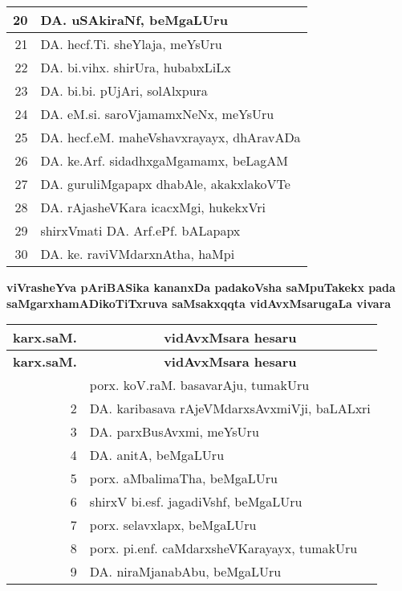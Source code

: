{\begin{longtable}{|r|p{10cm}|}
\hline
20 & DA. uSAkiraNf, beMgaLUru\\
\hline
21 & DA. hecf.Ti. sheYlaja, meYsUru\\
\hline
22 & DA. bi.vihx. shirUra, hubabxLiLx\\
\hline
23 & DA. bi.bi. pUjAri, solAlxpura\\
\hline
24 & DA. eM.si. saroVjamamxNeNx, meYsUru\\
\hline
25 & DA. hecf.eM. maheVshavxrayayx, dhAravADa\\
\hline
26 & DA. ke.Arf. sidadhxgaMgamamx, beLagAM\\
\hline
27 & DA. guruliMgapapx dhabAle, akakxlakoVTe\\
\hline
28 & DA. rAjasheVKara icacxMgi, hukekxVri\\
\hline
29 & shirxVmati DA. Arf.ePf. bALapapx\\
\hline
30 & DA. ke. raviVMdarxnAtha, haMpi\\
\hline
\end{longtable}}

\vskip 1cm


\begin{center}
{\large\bf viVrasheYva pAriBASika kananxDa padakoVsha saMpuTakekx pada saMgarxha\break mADikoTiTxruva saMsakxqqta vidAvxMsarugaLa vivara}
\end{center}

{\renewcommand{\arraystretch}{1.3}
\begin{longtable}{|r|p{10cm}|}
\hline
{\bf karx.saM.} & \multicolumn{1}{c|}{\bf vidAvxMsara hesaru}\\
\hline
\endfirsthead
\hline
{\bf karx.saM.} & \multicolumn{1}{c|}{\bf vidAvxMsara hesaru}\\
\hline
\endhead
\hline
\endfoot
\endlastfoot
1 & porx. koV.raM. basavarAju, tumakUru\\
\hline
2 & DA. karibasava rAjeVMdarxsAvxmiVji, baLALxri\\
\hline
3 & DA. parxBusAvxmi, meYsUru\\
\hline
4 & DA. anitA, beMgaLUru\\
\hline
5 & porx. aMbalimaTha, beMgaLUru\\
\hline
6 & shirxV bi.esf. jagadiVshf, beMgaLUru\\
\hline
7 & porx. selavxlapx, beMgaLUru\\
\hline
8 & porx. pi.enf. caMdarxsheVKarayayx, tumakUru\\
\hline
9 & DA. niraMjanabAbu, beMgaLUru\\
\hline
\end{longtable}}

